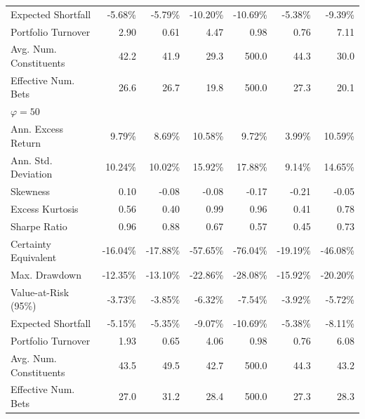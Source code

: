 \begin{tabular*}{\textwidth}{l@{\extracolsep{\fill}}rrrrrr}
Expected Shortfall & -5.68\% & -5.79\% & -10.20\% & -10.69\% & -5.38\% & -9.39\% \\
Portfolio Turnover & 2.90 & 0.61 & 4.47 & 0.98 & 0.76 & 7.11 \\
Avg. Num. Constituents & 42.2 & 41.9 & 29.3 & 500.0 & 44.3 & 30.0 \\
Effective Num. Bets & 26.6 & 26.7 & 19.8 & 500.0 & 27.3 & 20.1 \\
\midrule
\multicolumn{7}{l}{\textit{$\varphi = 50$}} \\
\midrule
Ann. Excess Return & 9.79\% & 8.69\% & 10.58\% & 9.72\% & 3.99\% & 10.59\% \\
Ann. Std. Deviation & 10.24\% & 10.02\% & 15.92\% & 17.88\% & 9.14\% & 14.65\% \\
Skewness & 0.10 & -0.08 & -0.08 & -0.17 & -0.21 & -0.05 \\
Excess Kurtosis & 0.56 & 0.40 & 0.99 & 0.96 & 0.41 & 0.78 \\
Sharpe Ratio & 0.96 & 0.88 & 0.67 & 0.57 & 0.45 & 0.73 \\
Certainty Equivalent & -16.04\% & -17.88\% & -57.65\% & -76.04\% & -19.19\% & -46.08\% \\
Max. Drawdown & -12.35\% & -13.10\% & -22.86\% & -28.08\% & -15.92\% & -20.20\% \\
Value-at-Risk (95\%) & -3.73\% & -3.85\% & -6.32\% & -7.54\% & -3.92\% & -5.72\% \\
Expected Shortfall & -5.15\% & -5.35\% & -9.07\% & -10.69\% & -5.38\% & -8.11\% \\
Portfolio Turnover & 1.93 & 0.65 & 4.06 & 0.98 & 0.76 & 6.08 \\
Avg. Num. Constituents & 43.5 & 49.5 & 42.7 & 500.0 & 44.3 & 43.2 \\
Effective Num. Bets & 27.0 & 31.2 & 28.4 & 500.0 & 27.3 & 28.3 \\
\bottomrule
\end{tabular*}
